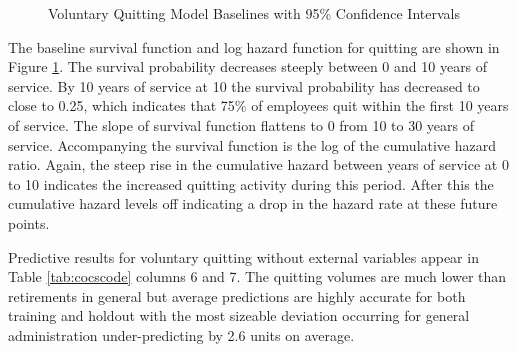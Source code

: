 \documentclass[12pt,letterpaper]{article}
\begin{document}
%		

\begin{figure}[h!]
	\centering
	\caption{Voluntary Quitting Model Baselines with 95\% Confidence Intervals}
	\label{fig:vqbasepred}
\end{figure}
The baseline survival function and log hazard function for quitting are shown in Figure \ref{fig:vqbasepred}. The survival probability decreases steeply between 0 and 10 years of service. By 10 years of service at 10 the survival probability has decreased to close to 0.25, which indicates that 75\% of employees quit within the first 10 years of service. The slope of survival function flattens to 0 from 10 to 30 years of service.  Accompanying the survival function is the log of the cumulative hazard ratio.  Again, the steep rise in the cumulative hazard between years of service at 0 to 10 indicates the increased quitting activity during this period.  After this the cumulative hazard levels off indicating a drop in the hazard rate at these future points.

Predictive results for voluntary quitting without external variables appear in Table \ref{tab:cocscode} columns 6 and 7. The quitting volumes are much lower than retirements in general but average predictions are highly accurate for both training and holdout with the most sizeable deviation occurring for general administration under-predicting by 2.6 units on average.
\end{document}
